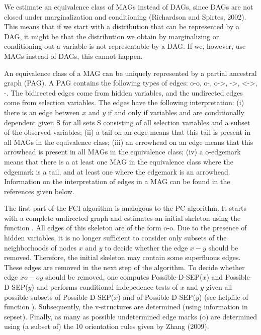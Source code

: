 \documentclass[article]{jss}
\begin{document}
We estimate an equivalence class of MAGs instead of DAGs, since DAGs are
not closed under marginalization and conditioning (Richardson and Spirtes,
2002). This means that if we start with a distribution that can be
represented by a DAG, it might be that the distribution we obtain by
marginalizing or conditioning out a variable is not representable by a
DAG. If we, however, use MAGs instead of DAGs, this cannot happen.

An equivalence class of a MAG can be uniquely represented by a partial
ancestral graph (PAG). A PAG contains the following types of edges: o-o,
o-, o->, ->, <->, -. The bidirected edges come from hidden variables, and
the undirected edges come from selection variables. The edges have the
following interpretation: (i) there is an edge between $x$ and $y$ if and
only if variables and are conditionally dependent given S for all sets S
consisting of all selection variables and a subset of the observed
variables; (ii) a tail on an edge means that this tail is present in all
MAGs in the equivalence class; (iii) an errowhead on an edge means that
this arrowhead is present in all MAGs in the equivalence class; (iv) a
o-edgemark means that there is a at least one MAG in the equivalence class
where the edgemark is a tail, and at least one where the edgemark is an
arrowhead. Information on the interpretation of edges in a MAG can be found
in the references given below.

The first part of the FCI algorithm is analogous to the PC algorithm. It
starts with a complete undirected graph and estimates an initial skeleton
using the function . All edges of this skeleton are of the
form o-o. Due to the presence of hidden variables, it is no longer
sufficient to consider only subsets of the neighborhoods of nodes $x$ and
$y$ to decide whether the edge $x-y$ should be removed.  Therefore, the
initial skeleton may contain some superfluous edges.  These edges are
removed in the next step of the algorithm. To decide whether edge $x o-o y$
should be removed, one computes Possible-D-SEP($x$) and Possible-D-SEP($y$)
and performs conditional indepedence tests of $x$ and $y$ given all
possible subsets of Possible-D-SEP($x$) and of Possible-D-SEP($y$) (see
helpfile of function ). Subsequently, the v-structures are
determined (using information in sepset).  Finally, as many as possible
undetermined edge marks (o) are determined using (a subset of) the 10
orientation rules given by Zhang (2009).

     
\end{document}
